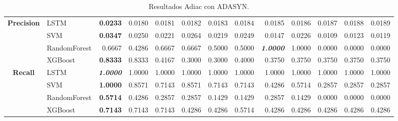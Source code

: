 \begin{table}[H]
\begin{adjustbox}{max width=12cm}
\begin{tabular}{|c|l|r|r|r|r|r|r|r|r|r|r|r|}
			\hline
			\textbf{Precision} &  LSTM & \textbf{  0.0233 } &  0.0180 &  0.0181 &  0.0182 &  0.0183 &  0.0184 &  0.0185 &  0.0186 &  0.0187 &  0.0188 &  0.0189 \\
			&  SVM & \textbf{  0.0347 } &  0.0250 &  0.0221 &  0.0264 &  0.0219 &  0.0249 &  0.0147 &  0.0226 &  0.0109 &  0.0123 &  0.0119 \\
			&  RandomForest &  0.6667 &  0.4286 &  0.6667 &  0.6667 &  0.5000 &  0.5000 & \textit{ \textbf{  1.0000 } } &  1.0000 &  0.0000 &  0.0000 &  0.0000 \\
			&  XGBoost & \textbf{  0.8333 } &  0.8333 &  0.4167 &  0.3000 &  0.3000 &  0.4000 &  0.3750 &  0.3750 &  0.3750 &  0.3750 &  0.3750 \\
			\hline
			\textbf{Recall} &  LSTM & \textit{ \textbf{  1.0000 } } &  1.0000 &  1.0000 &  1.0000 &  1.0000 &  1.0000 &  1.0000 &  1.0000 &  1.0000 &  1.0000 &  1.0000 \\
			&  SVM & \textbf{  1.0000 } &  0.8571 &  0.7143 &  0.8571 &  0.7143 &  0.7143 &  0.4286 &  0.5714 &  0.2857 &  0.2857 &  0.2857 \\
			&  RandomForest & \textbf{  0.5714 } &  0.4286 &  0.2857 &  0.2857 &  0.1429 &  0.1429 &  0.2857 &  0.1429 &  0.0000 &  0.0000 &  0.0000 \\
			&  XGBoost & \textbf{  0.7143 } &  0.7143 &  0.7143 &  0.4286 &  0.4286 &  0.5714 &  0.4286 &  0.4286 &  0.4286 &  0.4286 &  0.4286 \\
			\hline
		\end{tabular}
	\end{adjustbox}
	\caption{Resultados Adiac con ADASYN.}
	\label{tab:Adiac_ADASYN}
\end{table}

